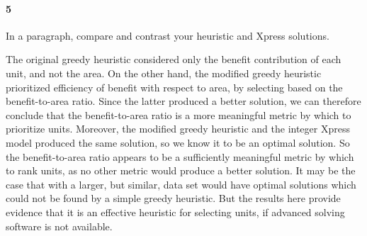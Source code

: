 \documentclass[12pt]{article}
\newenvironment{fullbox}{\begin{lrbox}{\savefullbox}\begin{minipage}{\dimexpr\textwidth-2\fboxsep\relax}}{\end{minipage}\end{lrbox}\begin{center}\framebox[\textwidth]{\usebox{\savefullbox}}\end{center}}
\newenvironment{pbox}[1][]{\begin{fullbox}\ifx#1\empty\else\paragraph{#1}\fi}{\end{fullbox}}
\theoremstyle{definition}
\begin{document}
\begin{pbox}[5]
     In a paragraph, compare and contrast your heuristic and Xpress solutions.
\end{pbox}

The original greedy heuristic considered only the benefit contribution of each unit, and not the area. On the other hand, the modified greedy heuristic prioritized efficiency of benefit with respect to area, by selecting based on the benefit-to-area ratio. Since the latter produced a better solution, we can therefore conclude that the benefit-to-area ratio is a more meaningful metric by which to prioritize units. Moreover, the modified greedy heuristic and the integer Xpress model produced the same solution, so we know it to be an optimal solution. So the benefit-to-area ratio appears to be a sufficiently meaningful metric by which to rank units, as no other metric would produce a better solution. It may be the case that with a larger, but similar, data set would have optimal solutions which could not be found by a simple greedy heuristic. But the results here provide evidence that it is an effective heuristic for selecting units, if advanced solving software is not available.
\end{document}
